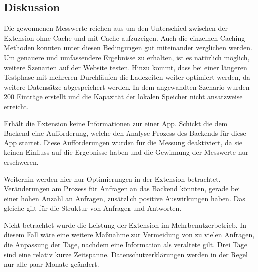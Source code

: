 \subsection{Diskussion}
\label{ss:diskussionht2}

Die gewonnenen Messwerte reichen aus um den Unterschied zwischen der Extension ohne Cache und mit Cache aufzuzeigen. Auch die einzelnen Caching-Methoden konnten unter diesen Bedingungen gut miteinander verglichen werden. Um genauere und umfassendere Ergebnisse zu erhalten, ist es natürlich möglich, weitere Szenarien auf der Website testen. Hinzu kommt, dass bei einer längeren Testphase mit mehreren Durchläufen die Ladezeiten weiter optimiert werden, da weitere Datensätze abgespeichert werden. In dem angewandten Szenario wurden 200 Einträge erstellt und die Kapazität der lokalen Speicher nicht ansatzweise erreicht.

Erhält die Extension keine Informationen zur einer App. Schickt die dem Backend eine Aufforderung, welche den Analyse-Prozess des Backends für diese App startet. Diese Aufforderungen wurden für die Messung deaktiviert, da sie keinen Einfluss auf die Ergebnisse haben und die Gewinnung der Messwerte nur erschweren.

Weiterhin werden hier nur Optimierungen in der Extension betrachtet. Veränderungen am Prozess für Anfragen an das Backend könnten, gerade bei einer hohen Anzahl an Anfragen, zusätzlich positive Auswirkungen haben. Das gleiche gilt für die Struktur von Anfragen und Antworten.

Nicht betrachtet wurde die Leistung der Extension im Mehrbenutzerbetrieb. In diesem Fall wäre eine weitere Maßnahme zur Vermeidung von zu vielen Anfragen, die Anpassung der Tage, nachdem eine Information als veraltete gilt. Drei Tage sind eine relativ kurze Zeitspanne. Datenschutzerklärungen werden in der Regel nur alle paar Monate geändert.